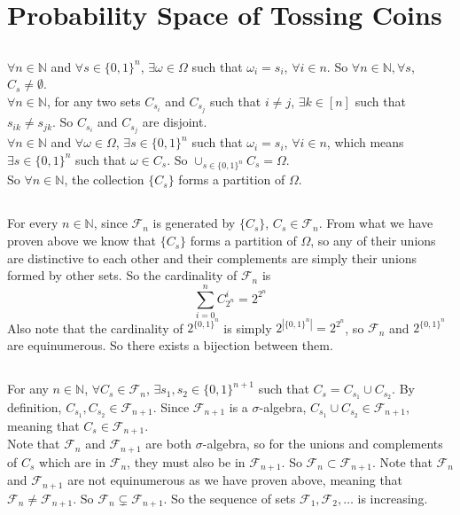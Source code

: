 \documentclass[12pt,letterpaper]{article}
\begin{document}
\section{Probability Space of Tossing Coins}
\subsection{}
$\forall n\in\mathbb{N}$ and $\forall s\in\{0,1\}^n$, $\exists\omega\in\Omega$ such that $\omega_i=s_i$, $\forall i\in n$. So $\forall n\in\mathbb{N},\forall s$, $C_s\neq\emptyset$.\\
$\forall n\in\mathbb{N}$, for any two sets $C_{s_{i}}$ and $C_{s_{j}}$ such that $i\neq j$, $\exists k\in [n]$ such that $s_{ik}\neq s_{jk}$. So $C_{s_{i}}$ and $C_{s_{j}}$ are disjoint.\\
$\forall n\in\mathbb{N}$ and $\forall\omega\in\Omega$, $\exists s\in\{0,1\}^n$ such that $\omega_i=s_i$, $\forall i\in n$, which means $\exists s\in \{0,1\}^n$ such that $\omega\in C_s$. So $\cup_{s\in\{0,1\}^n}C_s=\Omega$.\\
So $\forall n\in\mathbb{N}$, the collection $\{C_s\}$ forms a partition of $\Omega$.
\subsection{}
For every $n\in\mathbb{N}$, since $\mathcal{F}_n$ is generated by $\{C_s\}$, $C_s\in\mathcal{F}_n$. From what we have proven above we know that $\{C_s\}$ forms a partition of $\Omega$, so any of their unions are distinctive to each other and their complements are simply their unions formed by other sets.
So the cardinality of $\mathcal{F}_n$ is $$\sum_{i=0}^{n}C_{2^n}^{i}=2^{2^n}$$
Also note that the cardinality of $2^{\{0,1\}^n}$ is simply $2^{|\{0,1\}^n|}=2^{2^n}$, so $\mathcal{F}_n$ and $2^{\{0,1\}^n}$ are equinumerous. So there exists a bijection between them.
\subsection{} 
For any $n\in\mathbb{N}$, $\forall C_s\in \mathcal{F}_n$, $\exists s_1,s_2\in \{0,1\}^{n+1}$ such that $C_s=C_{s_1}\cup C_{s_2}$. 
By definition, $C_{s_1},C_{s_2}\in\mathcal{F}_{n+1}$. Since $\mathcal{F}_{n+1}$ is a $\sigma$-algebra, $C_{s_1}\cup C_{s_2}\in\mathcal{F}_{n+1}$, meaning that $C_s\in\mathcal{F}_{n+1}$.\\
Note that $\mathcal{F}_{n}$ and $\mathcal{F}_{n+1}$ are both $\sigma$-algebra, so for the unions and complements of $C_s$ which are in $\mathcal{F}_{n}$, they must also be in $\mathcal{F}_{n+1}$. So $\mathcal{F}_{n}\subset\mathcal{F}_{n+1}$. Note that $\mathcal{F}_{n}$ and $\mathcal{F}_{n+1}$ are not equinumerous as we have proven above, meaning that $\mathcal{F}_{n}\neq\mathcal{F}_{n+1}$. 
So $\mathcal{F}_{n}\subsetneq\mathcal{F}_{n+1}$. So the sequence of sets $\mathcal{F}_1,\mathcal{F}_2,\dots$ is increasing.
\end{document}
